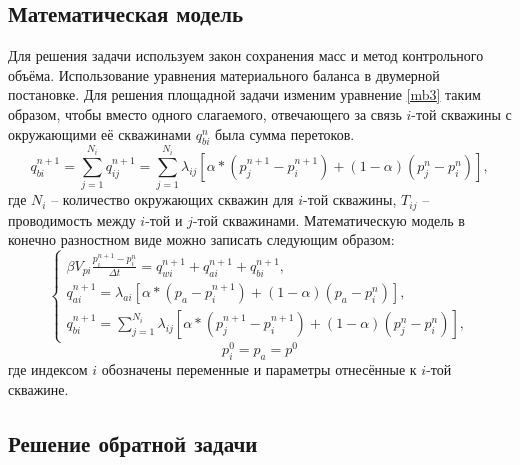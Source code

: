 \documentclass[14pt]{article}
\begin{document}
\subsection{Математическая модель}
Для решения задачи используем закон сохранения масс и метод контрольного объёма. 
Использование уравнения материального баланса в двумерной постановке.
Для решения площадной задачи изменим уравнение \ref{mb3} таким образом, чтобы вместо одного слагаемого, отвечающего за связь $i$-той скважины с окружающими её скважинами $q_{bi}^{n}$ была сумма перетоков.
\begin{equation}\label{mb3_tune}
	q_{bi}^{n+1} =  \sum_{j=1}^{N_i} q_{ij}^{n+1} = \sum_{j=1}^{N_i}\lambda_{ij} \left[\alpha*\left(p_j^{n+1} - p_i^{n+1}\right) + \left(1-\alpha\right)\left(p_j^n - p_i^n\right)\right],
\end{equation}
где $N_i$ -- количество окружающих скважин для $i$-той скважины, $T_{ij}$ -- проводимость между $i$-той и $j$-той скважинами. Математическую модель в конечно разностном виде можно записать следующим образом:
\begin{equation}\label{prx_sim}
	\begin{cases}
		\beta V_{pi}\frac{p_i^{n+1} - p_i^n}{\Delta t} = q_{wi}^{n+1} + q_{ai}^{n+1} + q_{bi}^{n+1},
		\\
		q_{ai}^{n+1} = \lambda_{ai} \left[\alpha*\left(p_{a} - p_i^{n+1}\right) + \left(1-\alpha\right)\left(p_a - p_i^n\right)\right],
		\\
		q_{bi}^{n+1} =  \sum_{j=1}^{N_i}\lambda_{ij} \left[\alpha*\left(p_j^{n+1} - p_i^{n+1}\right) + \left(1-\alpha\right)\left(p_j^n - p_i^n\right)\right],
	\end{cases}
\end{equation}
\begin{equation}\label{prx_sim_gy_ny}
	p_i^0 = p_a = p^0
\end{equation}	
где индексом $i$ обозначены переменные и параметры отнесённые к $i$-той скважине.

\subsection{Решение обратной задачи} 
\end{document}
